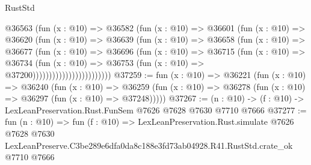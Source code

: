\begin{lexlean}{RustStd}
\begin{coremodule}
                            @36563
                              (fun (x : @10) =>
                              @36582
                                (fun (x : @10) =>
                                @36601
                                  (fun (x : @10) =>
                                  @36620
                                    (fun (x : @10) =>
                                    @36639
                                      (fun (x : @10) =>
                                      @36658
                                        (fun (x : @10) =>
                                        @36677
                                          (fun (x : @10) =>
                                          @36696
                                            (fun (x : @10) =>
                                            @36715
                                              (fun (x : @10) =>
                                              @36734
                                                (fun (x : @10) =>
                                                @36753
                                                  (fun (x : @10) => @37200))))))))))))))))))))))))
@37259 := fun (x : @10) =>
  @36221
    (fun (x : @10) =>
    @36240
      (fun (x : @10) =>
      @36259 (fun (x : @10) => @36278 (fun (x : @10) => @36297 (fun (x : @10) => @37248)))))
@37267 := (n : @10) -> (f : @10) -> LexLeanPreservation.Rust.FunSem @7626 @7628 @7630 @7710 @7666
@37277 := fun (n : @10) =>
  fun (f : @10) =>
  LexLeanPreservation.Rust.simulate
    @7626
    @7628
    @7630
    LexLeanPreserve.C3be289e6dfa0da8c188e3fd73ab04928.R41.RustStd.crate_ok
    @7710
    @7666
\end{coremodule}
\end{lexlean}
